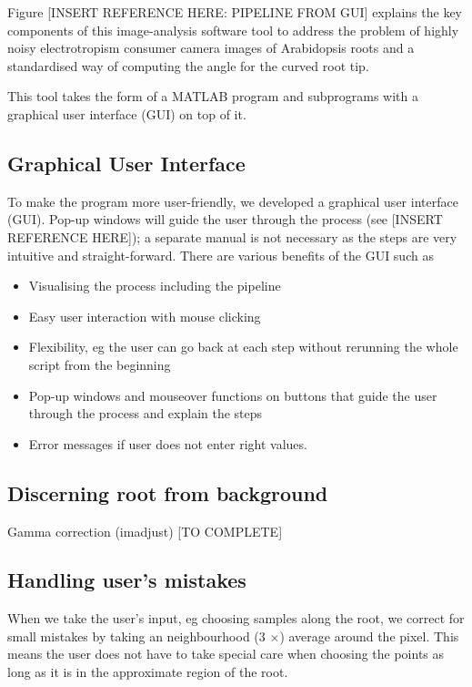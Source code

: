 Figure [INSERT REFERENCE HERE: PIPELINE FROM GUI] explains the key components of this image-analysis software tool to address the problem of highly noisy electrotropism consumer camera images of Arabidopsis roots and a standardised way of computing the angle for the curved root tip. 

This tool takes the form of a MATLAB program and subprograms with a graphical user interface (GUI) on top of it.

\subsection{Graphical User Interface}
To make the program more user-friendly, we developed a graphical user interface (GUI). Pop-up windows will guide the user through the process (see [INSERT REFERENCE HERE]); a separate manual is not necessary as the steps are very intuitive and straight-forward.
There are various benefits of the GUI such as
\begin{itemize}
	\item Visualising the process including the pipeline
	\item Easy user interaction with mouse clicking
	\item Flexibility, eg the user can go back at each step without rerunning the whole script from the beginning
	\item Pop-up windows and mouseover functions on buttons that guide the user through the process and explain the steps
	\item Error messages if user does not enter right values.
\end{itemize}


\subsection{Discerning root from background}

Gamma correction (imadjust)
[TO COMPLETE]


\subsection{Handling user's mistakes}

When we take the user's input, eg choosing samples along the root, we correct for small mistakes by taking an neighbourhood (3 \( \times \)) average around the pixel. 
This means the user does not have to take special care when choosing the points as long as it is in the approximate region of the root.

